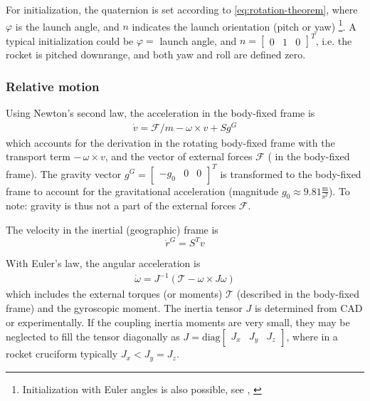 For initialization, the quaternion is set according to \autoref{eq:rotation-theorem}, where $\varphi$ is the launch angle, and $n$ indicates the launch orientation (pitch or yaw) \footnote{Initialization with Euler angles is also possible, see \cite{stevens2015}, \cite[p. 126]{zipfel2007}}.
A typical initialization could be $\varphi = $ launch angle, and $n = [\begin{smallmatrix} 0 & 1 & 0 \end{smallmatrix}]^T$, i.e. the rocket is pitched downrange, and both yaw and roll are defined zero.

\subsubsection{Relative motion}
Using Newton's second law, the acceleration in the body-fixed frame is \cite{zipfel2007, stevens2015}
\begin{align}
    \dot v = \mathcal{F}/m - \omega \times v + S g^G
    \label{eq:model-vel-deriv}
\end{align}
which accounts for the derivation in the rotating body-fixed frame with the transport term $- \, \omega \times v$, and the vector of external forces $\mathcal{F}$ ( in the body-fixed frame).
The gravity vector $g^G = \begin{bmatrix} -g_0 & 0 & 0 \end{bmatrix}^T$ is transformed to the body-fixed frame to account for the gravitational acceleration (magnitude $g_0 \approx 9.81 \frac{\mathrm{m}}{\mathrm{s}^2}$).
To note: gravity is thus not a part of the external forces $\mathcal{F}$.

The velocity in the inertial (geographic) frame is \cite{zipfel2007}
\begin{equation}
    \dot r^G = S^T v
    \label{eq:model-pos-deriv}
\end{equation}

With Euler's law, the angular acceleration is \cite{zipfel2007, schiehlen2017}
\begin{align}
   \dot \omega = J^{-1} (\mathcal{T} - \omega \times J \omega)
   \label{eq:model-rate-deriv}
\end{align}
which includes the external torques (or moments) $\mathcal{T}$ (described in the body-fixed frame) and the gyroscopic moment.
The inertia tensor $J$ is determined from CAD or experimentally. If the coupling inertia moments are very small, they may be neglected to fill the tensor diagonally as $J = \text{diag}\begin{bmatrix} J_x & J_y & J_z \end{bmatrix}$, where in a rocket cruciform typically $ J_x < J_y = J_z$.

